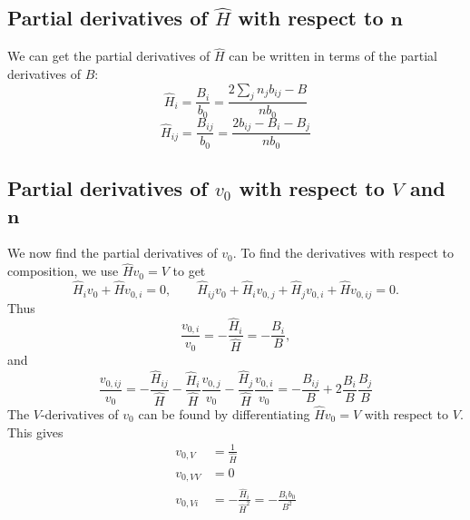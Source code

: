 \documentclass[english]{../thermomemo/thermomemo}
\newcommand{\mbn}[0]{\mathbf n}
\newcommand*{\hH}[0]{\hat H}
\numberwithin{equation}{section}
\begin{document}
\subsection*{Partial derivatives of $\hH$ with respect to $\mbn$}
We can get the partial derivatives of $\hH$ can be written in terms of
the partial derivatives of $B$:
\begin{equation}
  \hH_i = \frac{B_i}{b_0} = \frac{2 \sum_j n_j b_{ij} -B}{nb_0}
\end{equation}
\begin{equation}
  \hH_{ij} = \frac{B_{ij}}{b_0} = \frac{2b_{ij}-B_i-B_j}{nb_0}
\end{equation}
\subsection*{Partial derivatives of $v_0$ with respect to $V$ and
  $\mbn$}
We now find the partial derivatives of $v_0$. To find the derivatives
with respect to composition, we use $\hH v_0 = V$ to get
$$
\hH_i v_0 + \hH v_{0,i} = 0, \qquad \hH_{ij} v_0 + \hH_i v_{0,j} +
\hH_j v_{0,i} + \hH v_{0,ij} = 0.
$$
Thus
\begin{equation}
  \frac{v_{0,i}}{v_0} = - \frac{\hH_i}{\hH} = - \frac{B_i}{B},
\end{equation}
and
\begin{equation}
  \frac{v_{0,ij}}{v_0} = -\frac{\hH_{ij}}{\hH} - \frac{\hH_i}{\hH} \frac{v_{0,j}}{v_0} - \frac{\hH_j}{\hH} \frac{v_{0,i}}{v_0} = -\frac{B_{ij}}{B} + 2 \frac{B_i}{B} \frac{B_j}{B}
\end{equation}
The $V$-derivatives of $v_0$ can be found by differentiating $\hH v_0
= V$ with respect to $V$. This gives
\begin{align}
  v_{0,V}  &= \frac{1}{\hH} \\
  v_{0,VV} &= 0 \\
  v_{0,Vi} &= -\frac{\hH_i}{\hH^2} = -\frac{B_i b_0}{B^2}
\end{align}
\end{document}
